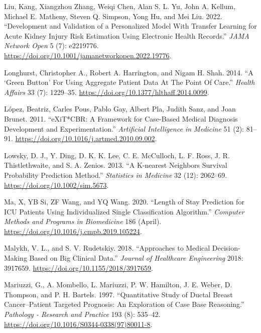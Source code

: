 \documentclass{article}
\newlength{\cslhangindent}
\newlength{\cslentryspacingunit} %
\newenvironment{CSLReferences}[2] %
 {%
  \setlength{\parindent}{0pt}
  \ifodd #1
  \let\oldpar\par
  \def\par{\hangindent=\cslhangindent\oldpar}
  \fi
  \setlength{\parskip}{#2\cslentryspacingunit}
 }%
 {}
\begin{document}
\begin{CSLReferences}{1}{0}
\leavevmode{}%
Liu, Kang, Xiangzhou Zhang, Weiqi Chen, Alan S. L. Yu, John A. Kellum,
Michael E. Matheny, Steven Q. Simpson, Yong Hu, and Mei Liu. 2022.
{``Development and {Validation} of a {Personalized Model With Transfer
Learning} for {Acute Kidney Injury Risk Estimation Using Electronic
Health Records}.''} \emph{JAMA Network Open} 5 (7): e2219776.
\url{https://doi.org/10.1001/jamanetworkopen.2022.19776}.

\leavevmode{}%
Longhurst, Christopher A., Robert A. Harrington, and Nigam H. Shah.
2014. {``A {`{Green Button}'} {For Using Aggregate Patient Data At The
Point Of Care}.''} \emph{Health Affairs} 33 (7): 1229--35.
\url{https://doi.org/10.1377/hlthaff.2014.0099}.

\leavevmode{}%
López, Beatriz, Carles Pous, Pablo Gay, Albert Pla, Judith Sanz, and
Joan Brunet. 2011. {``{eXiT}*{CBR}: {A} Framework for Case-Based Medical
Diagnosis Development and Experimentation.''} \emph{Artificial
Intelligence in Medicine} 51 (2): 81--91.
\url{https://doi.org/10.1016/j.artmed.2010.09.002}.

\leavevmode{}%
Lowsky, D. J., Y. Ding, D. K. K. Lee, C. E. McCulloch, L. F. Ross, J. R.
Thistlethwaite, and S. A. Zenios. 2013. {``A {K-nearest} Neighbors
Survival Probability Prediction Method.''} \emph{Statistics in Medicine}
32 (12): 2062--69. \url{https://doi.org/10.1002/sim.5673}.

\leavevmode{}%
Ma, X, YB Si, ZF Wang, and YQ Wang. 2020. {``Length of Stay Prediction
for {ICU} Patients Using Individualized Single Classification
Algorithm.''} \emph{Computer Methods and Programs in Biomedicine} 186
(April). \url{https://doi.org/10.1016/j.cmpb.2019.105224}.

\leavevmode{}%
Malykh, V. L., and S. V. Rudetskiy. 2018. {``Approaches to {Medical
Decision-Making Based} on {Big Clinical Data}.''} \emph{Journal of
Healthcare Engineering} 2018: 3917659.
\url{https://doi.org/10.1155/2018/3917659}.

\leavevmode{}%
Mariuzzi, G., A. Mombello, L. Mariuzzi, P. W. Hamilton, J. E. Weber, D.
Thompson, and P. H. Bartels. 1997. {``Quantitative Study of Ductal
Breast Cancer--Patient Targeted Prognosis: An Exploration of Case Base
Reasoning.''} \emph{Pathology - Research and Practice} 193 (8): 535--42.
\url{https://doi.org/10.1016/S0344-0338(97)80011-8}.


\end{CSLReferences}
\end{document}
